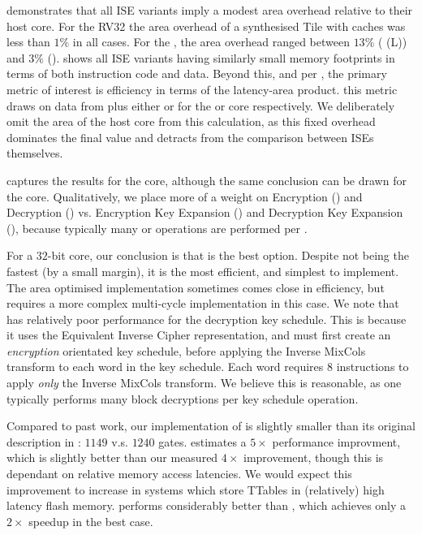 
demonstrates that all ISE variants
imply a modest area overhead relative to their host core.
For the RV32  the area overhead of a synthesised  Tile with
caches was less than $1\%$ in all cases.
For the , the area overhead ranged between
$13\%$ ( (L))
and
$3\%$ ().
shows all ISE variants
having similarly small memory footprints in terms of both instruction code and
data.
Beyond this, and per 
,
the primary metric of interest is efficiency in terms of
the latency-area product.
this metric draws on data from
plus either
or
for the  or  core respectively.
We deliberately omit the area of the host core from this calculation, as this
fixed overhead dominates the final value and detracts from the comparison
between ISEs themselves.

captures the results for the  core, although the same conclusion can 
be drawn for the  core.  Qualitatively, we place more of a weight on 
Encryption ()
and 
Decryption ()
vs.
Encryption Key Expansion ()
and 
Decryption Key Expansion (),
because
typically many  or  operations are performed per
.

For a $32$-bit core, our conclusion is that
is the best option.
Despite not being the fastest (by a small margin), it is the most efficient,
and simplest to implement.
The area optimised  implementation sometimes comes close in
efficiency, but requires a more complex multi-cycle implementation
in this case.
We note that  has relatively poor performance for the decryption
key schedule.
This is because it uses the Equivalent Inverse Cipher representation,
and must first create an {\em encryption} orientated key schedule, before
applying the Inverse MixCols transform to each word in the key schedule.
Each word requires $8$ instructions to apply {\em only} the Inverse MixCols
transform. We believe this is reasonable, as one typically performs
many block decryptions per key schedule operation.

Compared to past work, our implementation of  is
slightly smaller than its original description in \cite{Saarinen:20}:
$1149$ v.s. $1240$ gates.
\cite{Saarinen:20} estimates a $5\times$ performance improvment, which is
slightly better than our measured $4\times$ improvement, though this is
dependant on relative memory access latencies.
We would expect this improvement to increase in systems which store TTables
in (relatively) high latency flash memory.
 performs considerably better than \cite{TilGroSze:05},
which achieves only a $2\times$ speedup in the best case.

